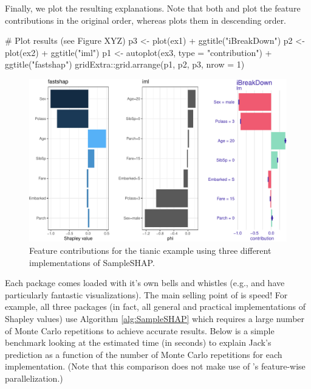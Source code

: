 Finally, we plot the resulting explanations. Note that both
 and  plot the feature contributions in
the original order, whereas  plots them in descending order.

\begin{Schunk}
\begin{Sinput}
# Plot results (see Figure XYZ)
p3 <- plot(ex1) + ggtitle("iBreakDown")
p2 <- plot(ex2) + ggtitle("iml")
p1 <- autoplot(ex3, type = "contribution") + ggtitle("fastshap")
gridExtra::grid.arrange(p1, p2, p3, nrow = 1)
\end{Sinput}
\begin{figure}[!htb]

{\centering \includegraphics[width=1\linewidth]{greenwell_files/figure-latex/titanic-jack-explanations-plot-1} 

}

\caption[Feature contributions for the tianic example using three different implementations of SampleSHAP]{Feature contributions for the tianic example using three different implementations of SampleSHAP.}\label{fig:titanic-jack-explanations-plot}
\end{figure}
\end{Schunk}

Each package comes loaded with it's own bells and whistles (e.g.,
 and  have particularly fantastic
visualizations). The main selling point of  is speed! For
example, all three packages (in fact, all general and practical
implementations of Shapley values) use Algorithm \ref{alg:SampleSHAP}
which requires a large number of Monte Carlo repetitions to achieve
accurate results. Below is a simple benchmark looking at the estimated
time (in seconds) to explain Jack's prediction as a function of the
number of Monte Carlo repetitions for each implementation. (Note that
this comparison does not make use of 's feature-wise
parallelization.)

